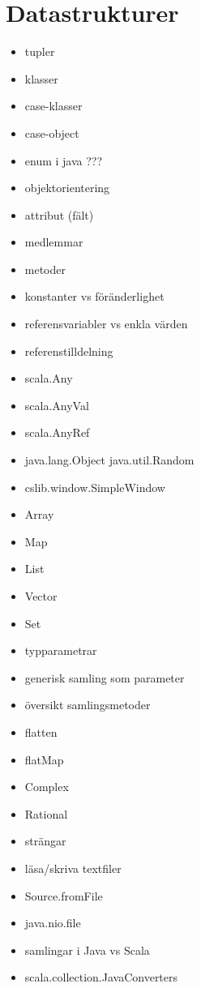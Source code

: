 \chapter{Datastrukturer}\label{chapter:W04}
\begin{itemize}[nosep]
\item tupler
\item klasser
\item case-klasser
\item case-object
\item enum i java ???
\item objektorientering
\item attribut (fält)
\item medlemmar
\item metoder
\item konstanter vs föränderlighet
\item referensvariabler vs enkla värden
\item referenstilldelning
\item scala.Any
\item scala.AnyVal
\item scala.AnyRef
\item java.lang.Object java.util.Random
\item cslib.window.SimpleWindow
\item Array
\item Map
\item List
\item Vector
\item Set
\item typparametrar
\item generisk samling som parameter
\item översikt samlingsmetoder
\item flatten
\item flatMap
\item Complex
\item Rational
\item strängar
\item läsa/skriva textfiler
\item Source.fromFile
\item java.nio.file
\item samlingar i Java vs Scala
\item scala.collection.JavaConverters
\end{itemize}